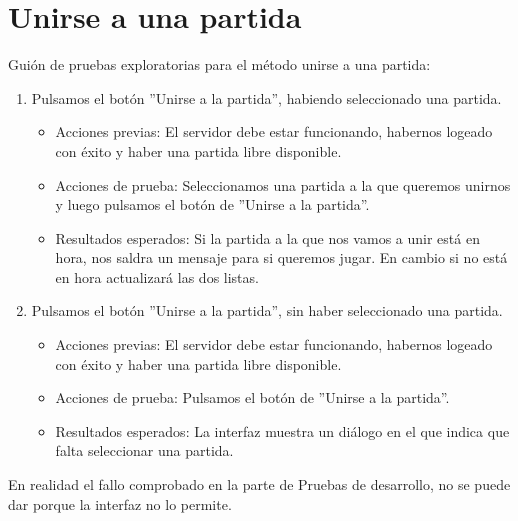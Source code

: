 \section{Unirse a una partida}

Guión de pruebas exploratorias para el método unirse a una partida:

\begin{enumerate}
\item Pulsamos el botón ''Unirse a la partida'', habiendo seleccionado una partida.
	\begin{itemize}
	\item Acciones previas: El servidor debe estar funcionando, habernos logeado con éxito y haber una partida libre disponible.
	\item Acciones de prueba: Seleccionamos una partida a la que queremos unirnos y luego pulsamos el botón de ''Unirse a la partida''.
	\item Resultados esperados: Si la partida a la que nos vamos a unir está en hora, nos saldra un mensaje para si queremos jugar. En cambio si no está en hora actualizará las dos listas.
	\end{itemize}
\item Pulsamos el botón ''Unirse a la partida'', sin haber seleccionado una partida.
	\begin{itemize}
	\item Acciones previas: El servidor debe estar funcionando, habernos logeado con éxito y haber una partida libre disponible.
	\item Acciones de prueba: Pulsamos el botón de ''Unirse a la partida''.
	\item Resultados esperados: La interfaz muestra un diálogo en el que indica que falta seleccionar una partida.
	\end{itemize}
\end{enumerate}

En realidad el fallo comprobado en la parte de Pruebas de desarrollo, no se puede dar porque la interfaz no lo permite.
